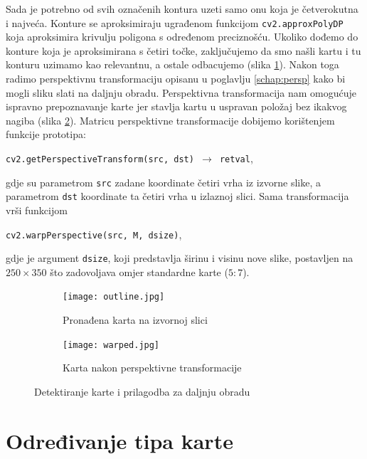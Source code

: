 \documentclass[times, zavrsni, numeric, utf8]{fer}
\newcommand{\code}[1]{\texttt{#1}}
\begin{document}
Sada je potrebno od svih označenih kontura uzeti samo onu koja je četverokutna i najveća. Konture se aproksimiraju ugrađenom funkcijom \code{cv2.approxPolyDP} koja aproksimira krivulju poligona s određenom preciznošću. Ukoliko dođemo do konture koja je aproksimirana s četiri točke, zaključujemo da smo našli kartu i tu konturu uzimamo kao relevantnu, a ostale odbacujemo (slika \ref{fig:onecont}). Nakon toga radimo perspektivnu transformaciju opisanu u poglavlju \ref{schap:persp} kako bi mogli sliku slati na daljnju obradu. Perspektivna transformacija nam omogućuje ispravno prepoznavanje karte jer stavlja kartu u uspravan položaj bez ikakvog nagiba (slika \ref{fig:warppersp}). Matricu perspektivne transformacije dobijemo korištenjem funkcije prototipa:
\begin{center}
\code{cv2.getPerspectiveTransform(src, dst) $\rightarrow$ retval},
\end{center}
gdje su parametrom \code{src} zadane koordinate četiri vrha iz izvorne slike, a parametrom \code{dst} koordinate ta četiri vrha u izlaznoj slici. Sama transformacija vrši funkcijom 
\begin{center}
\code{cv2.warpPerspective(src, M, dsize)}, 
\end{center}
gdje je argument \code{dsize}, koji predstavlja širinu i visinu nove slike, postavljen na $250 \times 350$ što zadovoljava omjer standardne karte ($5 : 7$).

\begin{figure}[H]
\begin{subfigure}{.5\textwidth}
  \centering
  \texttt{[image: outline.jpg]}
  \caption{Pronađena karta na izvornoj slici}
  \label{fig:onecont}
\end{subfigure}%
\begin{subfigure}{.5\textwidth}
  \centering
  \texttt{[image: warped.jpg]}
  \caption{Karta nakon perspektivne transformacije}
  \label{fig:warppersp}
\end{subfigure}
\caption{Detektiranje karte i prilagodba za daljnju obradu}
\label{fig:carddet}
\end{figure} 

\section{Određivanje tipa karte}
\label{schap:typcoldet}
\end{document}
